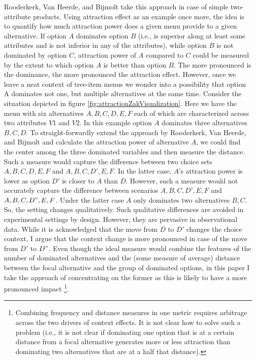 \documentclass[a4paper,12pt]{article}
\newcommand{\citeyearonly}[1]{\citeyearpar{#1}}
\begin{document}
Rooderkerk, Van Heerde, and Bijmolt \citeyearonly{roodrkerkEtAl11} take this approach in case of simple two-attribute products. Using attraction effect as an example once more, the idea is to quantify how much attraction power does a given menu provide to a given alternative. If option $A$ dominates option $B$ (i.e., is superior along at least some attributes and is not inferior in any of the attributes), while option $B$ is not dominated by option $C$, attraction power of $A$ compared to $C$ could be measured by the extent to which option $A$ is better than option $B$. The more pronounced is the dominance, the more pronounced the attraction effect. However, once we leave a neat context of tree-item menus we wonder into a possibility that option A dominates not one, but multiple alternatives at the same time. Consider the situation depicted in figure \ref{fig:attractionZakVisualization}. Here we have the menu with six alternatives ${A, B, C, D, E, F}$ each of which are characterized across two attributes $V1$ and $V2$. In this example option $A$ dominates three alternatives ${B, C, D}$. To straight-forwardly extend the approach by Rooderkerk, Van Heerde, and Bijmolt \citeyearonly{roodrkerkEtAl11} and calculate the attraction power of alternative $A$, we could find the center among the three dominated variables and then measure the distance. Such a measure would capture the difference between two choice sets ${A, B, C, D, E, F}$ and ${A, B, C, D', E, F}$. In the latter case, $A$'s attraction power is lower as option $D'$ is closer to $A$ than $D$. However, such a measure would not accurately capture the difference between scenarios ${A, B, C, D', E, F}$ and ${A, B, C, D", E, F}$. Under the latter case $A$ only dominates two alternatives ${B, C}$. So, the setting changes qualitatively. Such qualitative differences are avoided in experimental settings by design. However, they are pervasive in observational data. While it is acknowledged that the move from $D$ to $D'$ changes the choice context, I argue that the context change is more pronounced in case of the move from $D'$ to $D"$. Even though the ideal measure would combine the features of the number of dominated alternatives and the (some measure of average) distance between the focal alternative and the group of dominated options, in this paper I take the approach of concentrating on the former as this is likely to have a more pronounced impact \footnote{Combining frequency and distance measures in one metric requires arbitrage across the two drivers of context effects. It is not clear how to solve such a problem (i.e., it is not clear if dominating one option that is at a certain distance from a focal alternative generates more or less attraction than dominating two alternatives that are at a half that distance).}. 
\end{document}
